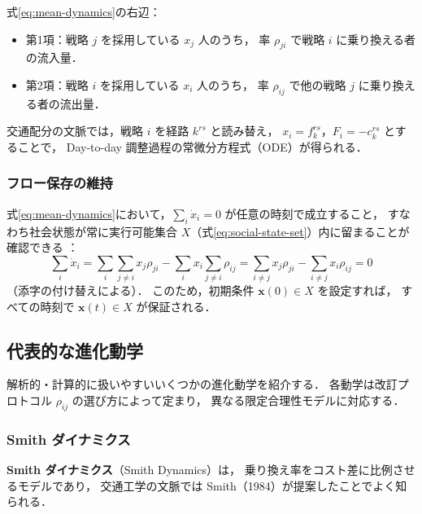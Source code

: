 式\eqref{eq:mean-dynamics}の右辺：
\begin{itemize}
  \item 第1項：戦略 $j$ を採用している $x_j$ 人のうち，
        率 $\rho_{ji}$ で戦略 $i$ に乗り換える者の流入量．
  \item 第2項：戦略 $i$ を採用している $x_i$ 人のうち，
        率 $\rho_{ij}$ で他の戦略 $j$ に乗り換える者の流出量．
\end{itemize}

交通配分の文脈では，戦略 $i$ を経路 $k^{rs}$ と読み替え，
$x_i = f_k^{rs}$，$F_i = -c_k^{rs}$ とすることで，
Day-to-day 調整過程の常微分方程式（ODE）が得られる．

\subsubsection*{フロー保存の維持}

式\eqref{eq:mean-dynamics}において，$\sum_i \dot{x}_i = 0$ が任意の時刻で成立すること，
すなわち社会状態が常に実行可能集合 $X$（式\eqref{eq:social-state-set}）内に留まることが確認できる
\cite{Sandholm2010}：
\begin{equation*}
  \sum_i \dot{x}_i
  = \sum_i \sum_{j \neq i} x_j \rho_{ji}
    - \sum_i x_i \sum_{j \neq i} \rho_{ij}
  = \sum_{i \neq j} x_j \rho_{ji} - \sum_{i \neq j} x_i \rho_{ij}
  = 0
\end{equation*}
（添字の付け替えによる）．
このため，初期条件 $\boldsymbol{x}(0) \in X$ を設定すれば，
すべての時刻で $\boldsymbol{x}(t) \in X$ が保証される．

\subsection{代表的な進化動学}
\label{subsec:dynamics-examples}

解析的・計算的に扱いやすいいくつかの進化動学を紹介する．
各動学は改訂プロトコル $\rho_{ij}$ の選び方によって定まり，
異なる限定合理性モデルに対応する\cite{Sandholm2010}．

\subsubsection*{Smith ダイナミクス}

\textbf{Smith ダイナミクス}（Smith Dynamics）は，
乗り換え率をコスト差に比例させるモデルであり，
交通工学の文脈では Smith（1984）\cite{Smith1984}が提案したことでよく知られる．

